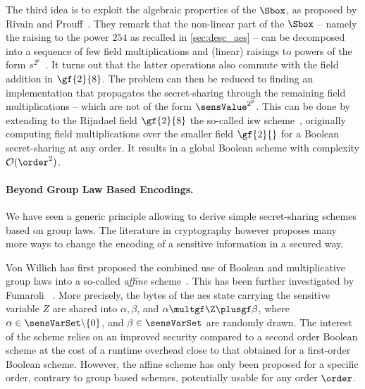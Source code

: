 The third idea is to exploit the algebraic properties of the \(\Sbox\), as proposed by Rivain and Prouff~\cite{rivain_provably_2010}.
They remark that the non-linear part of the \(\Sbox\) -- namely the raising to the power \(254\) as recalled in \autoref{sec:desc_aes} -- can be decomposed into a sequence of few field multiplications and (linear) raisings to powers of the form \(s^{2^p}\)~\cite[Lem.~5.3.4]{terras_2018}.
It turns out that the latter operations also commute with the field addition in \(\gf{2}{8}\).
The problem can then be reduced to finding an implementation that propagates the secret-sharing through the remaining field multiplications -- which are not of the form \(\sensValue^{2^p}\).
This can be done by extending to the Rijndael field \(\gf{2}{8}\) the so-called \gls{isw} scheme~\cite{isw_03}, originally computing field multiplications over the smaller field \(\gf{2}{}\) for a Boolean secret-sharing at any order.
It results in a global Boolean scheme with complexity \(\mathcal{O}(\order^2)\).

\paragraph{Beyond Group Law Based Encodings.}
We have seen a generic principle allowing to derive simple secret-sharing schemes based on group laws.
The literature in \gls{cryptography} however proposes many more ways to change the encoding of a sensitive information in a secured way.

Von Willich has first proposed the combined use of Boolean and multiplicative group laws into a so-called \emph{affine} scheme~\cite{willich_technique_2001}.
This has been further investigated by Fumaroli \etal{}~\cite{fumaroli_affine_2010}.
More precisely, the bytes of the \gls{aes} state carrying the sensitive variable \(Z\) are shared into \(\alpha, \beta\), and \(\alpha \multgf \Z \plusgf \beta\), where \(\alpha \in \sensVarSet\backslash\{0\}\), and \(\beta \in \sensVarSet\) are randomly drawn.
The interest of the scheme relies on an improved security compared to a second order Boolean scheme at the cost of a runtime overhead close to that obtained for a first-order Boolean scheme.
However, the affine scheme has only been proposed for a specific order, contrary to group based schemes, potentially usable for any order \(\order\).


